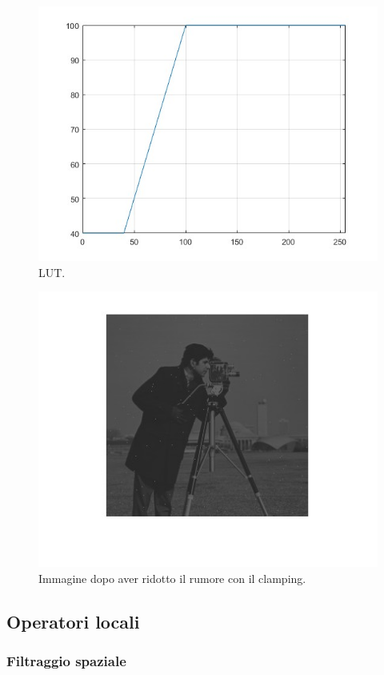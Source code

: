 \documentclass[a4paper]{article}
\begin{document}
	\begin{figure}[!htp]
		\centering
		\includegraphics[width=.9\textwidth]{img/lab/operatori_puntuali-7.jpg}
		\caption{LUT.}
	\end{figure}
	\begin{figure}[!htp]
		\centering
		\includegraphics[width=.9\textwidth]{img/lab/operatori_puntuali-8.jpg}
		\caption{Immagine dopo aver ridotto il rumore con il clamping.}
	\end{figure}\newpage
	
	\subsection{Operatori locali}
	
	\subsubsection{Filtraggio spaziale}
	
\end{document}
